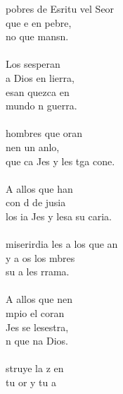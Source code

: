 \begin{cancion}%
	 pobres de Esritu vel Seor \\
	que e en pebre, \\
	no que mansn.  \\
\jump\\
	Los sesperan\\
	a Dios en lierra,\\
	esan quezca en \\
	 mundo n guerra.\\
\jump\\
	 hombres que oran \\
	nen un anlo,\\
	que ca Jes y les tga cone. \\
\jump\\
	A allos que han \\
	con d de jusia\\
	los ia Jes y lesa su caria.\\
\jump\\
	miserirdia les a los que an\\
	y a os los mbres\\
	su a les rrama. \\
\jump\\
	A allos que nen \\
	mpio el coran\\
	Jes se lesestra, \\
	n que na Dios.\\
\jump\\
	struye la z en \\
	tu or y tu a\\

\end{cancion}
